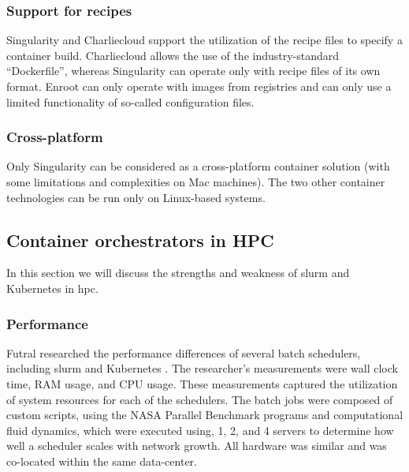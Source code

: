 \documentclass[12pt]{article}
\begin{document}
    
    \subsubsection{Support for recipes}
    Singularity and Charliecloud support the utilization of the recipe files to specify a container build. Charliecloud allows the use of the industry-standard ``Dockerfile'', whereas Singularity can operate only with recipe files of its own format. Enroot can only operate with images from registries and can only use a limited functionality of so-called configuration files.
    
    \subsubsection{Cross-platform}
    Only Singularity can be considered as a cross-platform container solution (with some limitations and complexities on Mac machines). The two other container technologies can be run only on Linux-based systems.


\subsection{Container orchestrators in HPC}
\label{containers_hpc}
In this section we will discuss the strengths and weakness of \gls{slurm} and Kubernetes in \gls{hpc}.

\subsubsection{Performance}
Futral researched the performance differences of several batch schedulers, including \gls{slurm} and Kubernetes \cite{futral2019method}. The researcher's measurements were wall clock time, RAM usage, and CPU usage. These measurements captured the utilization of system resources for each of the schedulers. The batch jobs were composed of custom scripts, using the NASA Parallel Benchmark programs and computational fluid dynamics, which were executed using, 1, 2, and 4 servers to determine how well a scheduler scales with network growth. All hardware was similar and was co-located within the same data-center.
\end{document}
